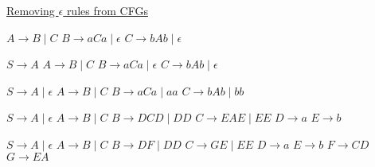 \documentclass[9pt]{article}
\begin{document}
\uline{Removing $\epsilon$ rules from CFGs}\newline
\begin{minipage}[t]{.20\textwidth}
$A\rightarrow B\mid C$\newline
$B\rightarrow aCa\mid \epsilon$\newline
$C\rightarrow bAb\mid \epsilon$
\end{minipage}%
\begin{minipage}[t]{.20\textwidth}
$S\rightarrow A$\newline
$A\rightarrow B\mid C$\newline
$B\rightarrow aCa\mid \epsilon$\newline
$C\rightarrow bAb\mid \epsilon$
\end{minipage}%
\begin{minipage}[t]{.20\textwidth}
$S\rightarrow A \mid \epsilon$\newline
$A\rightarrow B\mid C$\newline
$B\rightarrow aCa\mid aa$\newline
$C\rightarrow bAb\mid bb$
\end{minipage}%
\begin{minipage}[t]{.20\textwidth}
$S\rightarrow A \mid \epsilon$\newline
$A\rightarrow B\mid C$\newline
$B\rightarrow DCD\mid DD$\newline
$C\rightarrow EAE\mid EE$\newline
$D\rightarrow a$\newline
$E\rightarrow b$
\end{minipage}%
\begin{minipage}[t]{.20\textwidth}
$S\rightarrow A \mid \epsilon$\newline
$A\rightarrow B\mid C$\newline
$B\rightarrow DF\mid DD$\newline
$C\rightarrow GE\mid EE$\newline
$D\rightarrow a$\newline
$E\rightarrow b$\newline
$F\rightarrow CD$\newline
$G\rightarrow EA$
\end{minipage}
\end{document}
